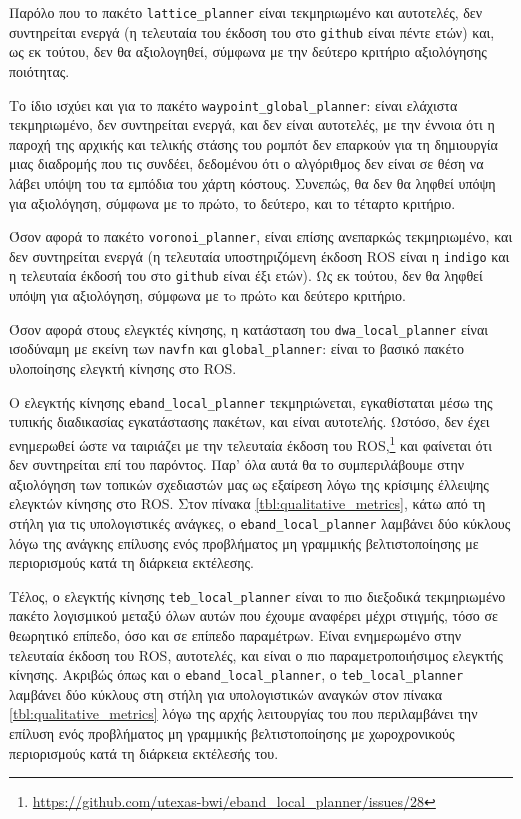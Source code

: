 Παρόλο που το πακέτο \texttt{lattice\_planner} είναι τεκμηριωμένο και
αυτοτελές, δεν συντηρείται ενεργά (η τελευταία του έκδοση του στο
\texttt{github} είναι πέντε ετών) και, ως εκ τούτου, δεν θα αξιολογηθεί,
σύμφωνα με την δεύτερο κριτήριο αξιολόγησης ποιότητας.

Το ίδιο ισχύει και για το πακέτο \texttt{waypoint\_global\_planner}: είναι
ελάχιστα τεκμηριωμένο, δεν συντηρείται ενεργά, και δεν είναι αυτοτελές, με την
έννοια ότι η παροχή της αρχικής και τελικής στάσης του ρομπότ δεν επαρκούν για
τη δημιουργία μιας διαδρομής που τις συνδέει, δεδομένου ότι ο αλγόριθμος δεν
είναι σε θέση να λάβει υπόψη του τα εμπόδια του χάρτη κόστους.  Συνεπώς, θα δεν
θα ληφθεί υπόψη για αξιολόγηση, σύμφωνα με το πρώτο, το δεύτερο, και το τέταρτο
κριτήριο.

Όσον αφορά το πακέτο \texttt{voronoi\_planner}, είναι επίσης ανεπαρκώς
τεκμηριωμένο, και δεν συντηρείται ενεργά (η τελευταία υποστηριζόμενη έκδοση ROS
είναι η \texttt{indigo} και η τελευταία έκδοσή του στο \texttt{github} είναι
έξι ετών). Ως εκ τούτου, δεν θα ληφθεί υπόψη για αξιολόγηση, σύμφωνα με τo
πρώτo και δεύτερο κριτήριο.

Όσον αφορά στους ελεγκτές κίνησης, η κατάσταση του \texttt{dwa\_local\_planner}
είναι ισοδύναμη με εκείνη των \texttt{navfn} και \texttt{global\_planner}:
είναι το βασικό πακέτο υλοποίησης ελεγκτή κίνησης στο ROS.

Ο ελεγκτής κίνησης \texttt{eband\_local\_planner} τεκμηριώνεται, εγκαθίσταται
μέσω της τυπικής διαδικασίας εγκατάστασης πακέτων, και είναι αυτοτελής. Ωστόσο,
δεν έχει ενημερωθεί ώστε να ταιριάζει με την τελευταία έκδοση του
ROS,\footnote{\url{https://github.com/utexas-bwi/eband\_local\_planner/issues/28}}
και φαίνεται ότι δεν συντηρείται επί του παρόντος. Παρ' όλα αυτά θα το
συμπεριλάβουμε στην αξιολόγηση των τοπικών σχεδιαστών μας ως εξαίρεση λόγω της
κρίσιμης έλλειψης ελεγκτών κίνησης στο ROS. Στον πίνακα
\ref{tbl:qualitative_metrics}, κάτω από τη στήλη για τις υπολογιστικές ανάγκες,
ο \texttt{eband\_local\_planner} λαμβάνει δύο κύκλους λόγω της ανάγκης επίλυσης
ενός προβλήματος μη γραμμικής βελτιστοποίησης με περιορισμούς κατά τη διάρκεια
εκτέλεσης.

Τέλος, ο ελεγκτής κίνησης \texttt{teb\_local\_planner} είναι το πιο διεξοδικά
τεκμηριωμένο πακέτο λογισμικού μεταξύ όλων αυτών που έχουμε αναφέρει μέχρι
στιγμής, τόσο σε θεωρητικό επίπεδο, όσο και σε επίπεδο παραμέτρων. Είναι
ενημερωμένο στην τελευταία έκδοση του ROS, αυτοτελές, και είναι ο πιο
παραμετροποιήσιμος ελεγκτής κίνησης. Ακριβώς όπως και ο
\texttt{eband\_local\_planner}, ο \texttt{teb\_local\_planner} λαμβάνει δύο
κύκλους στη στήλη για υπολογιστικών αναγκών στον πίνακα
\ref{tbl:qualitative_metrics} λόγω της αρχής λειτουργίας του που περιλαμβάνει
την επίλυση ενός προβλήματος μη γραμμικής βελτιστοποίησης με χωροχρονικούς
περιορισμούς κατά τη διάρκεια εκτέλεσής του.

